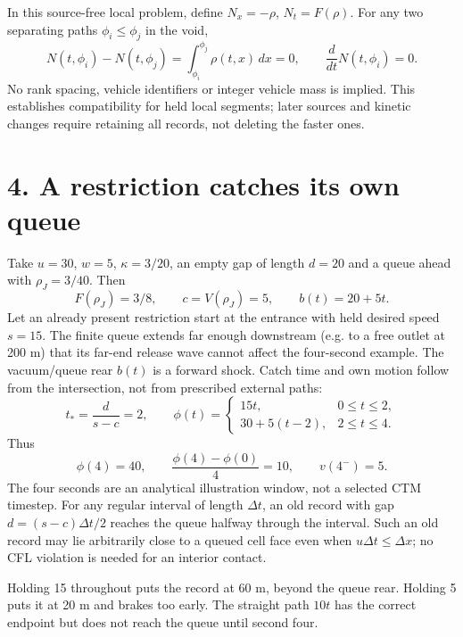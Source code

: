 \documentclass[11pt,a4paper]{article}
\begin{document}
In this source-free local problem, define $N_x=-\rho$, $N_t=F(\rho)$.
For any two separating paths $\phi_i\le\phi_j$ in the void,
\begin{equation}
 N(t,\phi_i)-N(t,\phi_j)=\int_{\phi_i}^{\phi_j}\rho(t,x)\,dx=0,
 \qquad \frac{d}{dt}N(t,\phi_i)=0.
\end{equation}
No rank spacing, vehicle identifiers or integer vehicle mass is implied.
This establishes compatibility for held local segments; later sources and
kinetic changes require retaining all records, not deleting the faster ones.

\newpage
\section*{4. A restriction catches its own queue}
Take $u=30$, $w=5$, $\kappa=3/20$, an empty gap of length $d=20$ and a
queue ahead with $\rho_J=3/40$. Then
\begin{equation}
 F(\rho_J)=3/8,\qquad c=V(\rho_J)=5,
 \qquad b(t)=20+5t.
\end{equation}
Let an already present restriction start at the entrance with held desired
speed $s=15$. The finite queue extends far enough downstream (e.g. to a free
outlet at 200 m) that its far-end release wave cannot affect the four-second
example. The vacuum/queue rear $b(t)$ is a forward shock. Catch time and
own motion follow from the intersection, not from prescribed external paths:
\begin{equation}
 t_* = \frac{d}{s-c}=2,\qquad
 \phi(t)=\begin{cases}15t,&0\le t\le2,\\
 30+5(t-2),&2\le t\le4.\end{cases}
\end{equation}
Thus
\begin{equation}
 \phi(4)=40,\qquad
 \frac{\phi(4)-\phi(0)}4=10,\qquad v(4^-)=5.
\end{equation}
The four seconds are an analytical illustration window, not a selected CTM
timestep. For any regular interval of length $\Delta t$, an old record with
gap $d=(s-c)\Delta t/2$ reaches the queue halfway through the interval. Such
an old record may lie arbitrarily close to a queued cell face even when
$u\Delta t\le\Delta x$; no CFL violation is needed for an interior contact.

Holding 15 throughout puts the record at 60 m, beyond the queue rear.
Holding 5 puts it at 20 m and brakes too early. The straight path $10t$ has
the correct endpoint but does not reach the queue until second four.
\end{document}
